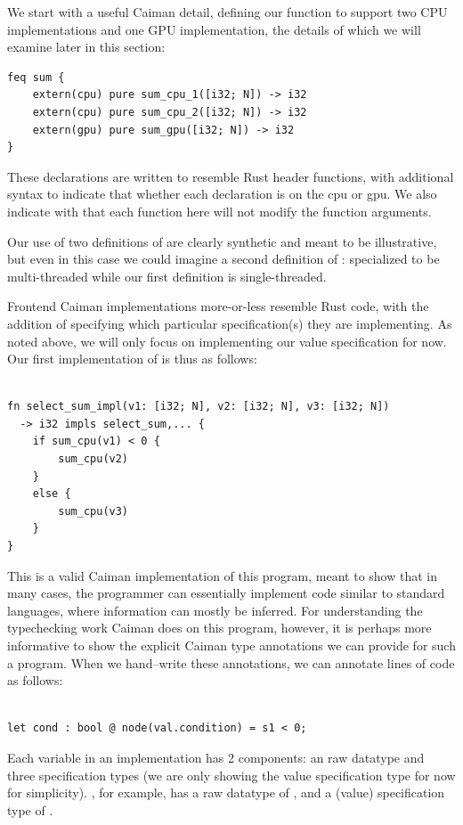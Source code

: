 We start with a useful Caiman detail, defining our function  to support two CPU implementations and one GPU implementation, the details of which we will examine later in this section:
%
\begin{lstlisting}
feq sum {
	extern(cpu) pure sum_cpu_1([i32; N]) -> i32
	extern(cpu) pure sum_cpu_2([i32; N]) -> i32
	extern(gpu) pure sum_gpu([i32; N]) -> i32
}
\end{lstlisting}
%
These declarations are written to resemble Rust header functions, with additional syntax to indicate that whether each declaration is on the cpu or gpu.  We also indicate with  that each function here will not modify the function arguments.

Our use of two definitions of  are clearly synthetic and meant to be illustrative, but even in this case we could imagine a second definition of : specialized to be multi-threaded while our first definition is single-threaded.

Frontend Caiman implementations more-or-less resemble Rust code, with the addition of specifying which particular specification(s) they are implementing.  As noted above, we will only focus on implementing our value specification for now.  Our first implementation of  is thus as follows:
%
\begin{lstlisting}

fn select_sum_impl(v1: [i32; N], v2: [i32; N], v3: [i32; N]) 
  -> i32 impls select_sum,... {
    if sum_cpu(v1) < 0 { 
        sum_cpu(v2)
    }
    else {
        sum_cpu(v3)
    }
}
\end{lstlisting}
%
This is a valid Caiman implementation of this program, meant to show that in many cases, the programmer can essentially implement code similar to standard languages, where information can mostly be inferred.  For understanding the typechecking work Caiman does on this program, however, it is perhaps more informative to show the explicit Caiman type annotations we can provide for such a program.  When we hand--write these annotations, we can annotate lines of code as follows:
%
\begin{lstlisting}
	
let cond : bool @ node(val.condition) = s1 < 0;
\end{lstlisting}
%
Each variable in an implementation has 2 components: an raw datatype and three specification types (we are only showing the value specification type for now for simplicity).  , for example, has a raw datatype of , and a (value) specification type of .


